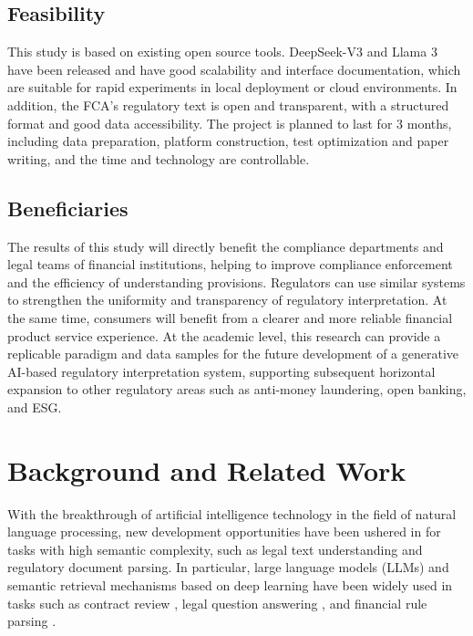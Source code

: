 \documentclass[a4paper,11pt]{article}
\begin{document}
\subsection{Feasibility}

This study is based on existing open source tools. DeepSeek-V3 and Llama 3 have been released and have good scalability and interface documentation, which are suitable for rapid experiments in local deployment or cloud environments. In addition, the FCA's regulatory text is open and transparent, with a structured format and good data accessibility. The project is planned to last for 3 months, including data preparation, platform construction, test optimization and paper writing, and the time and technology are controllable.

\subsection{Beneficiaries}

The results of this study will directly benefit the compliance departments and legal teams of financial institutions, helping to improve compliance enforcement and the efficiency of understanding provisions. Regulators can use similar systems to strengthen the uniformity and transparency of regulatory interpretation. At the same time, consumers will benefit from a clearer and more reliable financial product service experience. At the academic level, this research can provide a replicable paradigm and data samples for the future development of a generative AI-based regulatory interpretation system, supporting subsequent horizontal expansion to other regulatory areas such as anti-money laundering, open banking, and ESG.

\section{Background and Related Work}

With the breakthrough of artificial intelligence technology in the field of natural language processing, new development opportunities have been ushered in for tasks with high semantic complexity, such as legal text understanding and regulatory document parsing. In particular, large language models (LLMs) and semantic retrieval mechanisms based on deep learning have been widely used in tasks such as contract review \cite{zhong2020jec}, legal question answering \cite{chalkidis2020legalbert}, and financial rule parsing \cite{zhang2023regtech}.
\end{document}
